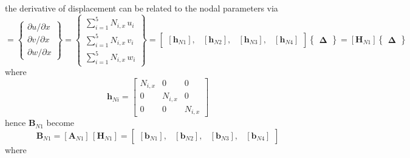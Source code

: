 the derivative of displacement can be related to the nodal parameters via
\begin{equation}
[\boldsymbol{\theta}_{N1}] =  \begin{Bmatrix}
\partial u / \partial x\\
\partial v / \partial x \\
\partial w / \partial x
\end{Bmatrix}
= \begin{Bmatrix}
\sum\nolimits_{i=1}^5 N_{i,x} \, u_i\\
\sum\nolimits_{i=1}^5 N_{i,x} \, v_i \\
\sum\nolimits_{i=1}^5 N_{i,x} \, w_i
\end{Bmatrix} 
= \begin{bmatrix}
[\mathbf{h}_{N1}], & [\mathbf{h}_{N2}], & [\mathbf{h}_{N3}], & [\mathbf{h}_{N4}]
\end{bmatrix}  \begin{Bmatrix} \boldsymbol{\Delta} \end{Bmatrix}  
= [\mathbf{H}_{N1}] \begin{Bmatrix} \boldsymbol{\Delta} \end{Bmatrix} 
\end{equation}
where 
\begin{equation}
\mathbf{h}_{Ni} = \begin{bmatrix}
N_{i,x} &  0 & 0  \\
0 & N_{i,x} & 0  \\
0 & 0 & N_{i,x}\end{bmatrix} 
\end{equation}
hence $\mathbf{B}_{N1}$ become
\begin{equation}
\mathbf{B}_{N1} = [\mathbf{A}_{N1}] \, [\mathbf{H}_{N1}] = \begin{bmatrix}
[\mathbf{b}_{N1}], & [\mathbf{b}_{N2}], & [\mathbf{b}_{N3}], & [\mathbf{b}_{N4}] 
\end{bmatrix} 
\end{equation}
where
